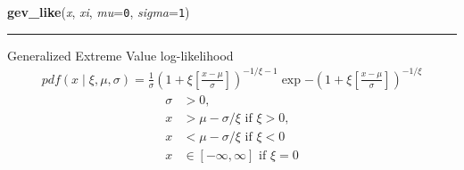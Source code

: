 \hspace{.8\funcindent}\begin{boxedminipage}{\funcwidth}

    \raggedright \textbf{gev\_like}(\textit{x}, \textit{xi}, \textit{mu}={\tt 0}, \textit{sigma}={\tt 1})

    \vspace{-1.5ex}

    \rule{\textwidth}{0.5\fboxrule}
\setlength{\parskip}{2ex}

Generalized Extreme Value log-likelihood
\begin{equation*}\begin{split}pdf(x \mid \xi,\mu,\sigma) = \frac{1}{\sigma}(1 + \xi \left[\frac{x-\mu}{\sigma}\right])^{-1/\xi-1}\exp{-(1+\xi \left[\frac{x-\mu}{\sigma}\right])^{-1/\xi}}\end{split}\end{equation*}\begin{equation*}\begin{split}\sigma & > 0,\\x & > \mu-\sigma/\xi \text{ if } \xi > 0,\\x & < \mu-\sigma/\xi \text{ if } \xi < 0\\x & \in [-\infty,\infty] \text{ if } \xi = 0\end{split}\end{equation*}\setlength{\parskip}{1ex}
    \end{boxedminipage}

    \label{pymc:distributions:half_normal_like}

    \vspace{0.5ex}

